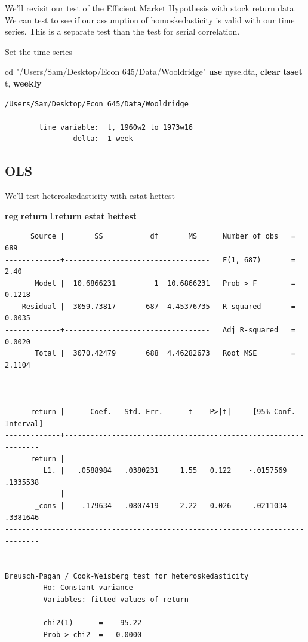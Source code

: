 \documentclass[
]{book}
\newenvironment{Shaded}{\begin{snugshade}}{\end{snugshade}}
\newcommand{\FunctionTok}[1]{\textcolor[rgb]{0.13,0.29,0.53}{\textbf{#1}}}
\newcommand{\KeywordTok}[1]{\textcolor[rgb]{0.13,0.29,0.53}{\textbf{#1}}}
\newcommand{\NormalTok}[1]{#1}
\newcommand{\OtherTok}[1]{\textcolor[rgb]{0.56,0.35,0.01}{#1}}
\newcommand{\StringTok}[1]{\textcolor[rgb]{0.31,0.60,0.02}{#1}}
\begin{document}
We'll revisit our test of the Efficient Market Hypothesis with stock return data.
We can test to see if our assumption of homoskedasticity is valid with our
time series. This is a separate test than the test for serial correlation.

Set the time series

\begin{Shaded}
\begin{Highlighting}[]
\NormalTok{cd }\StringTok{"/Users/Sam/Desktop/Econ 645/Data/Wooldridge"}
\KeywordTok{use}\NormalTok{ nyse.dta, }\KeywordTok{clear}
\KeywordTok{tsset}\NormalTok{ t, }\FunctionTok{weekly}
\end{Highlighting}
\end{Shaded}

\begin{verbatim}
/Users/Sam/Desktop/Econ 645/Data/Wooldridge

        time variable:  t, 1960w2 to 1973w16
                delta:  1 week
\end{verbatim}

\subsection*{OLS}\label{ols-3}

We'll test heteroskedasticity with estat hettest

\begin{Shaded}
\begin{Highlighting}[]
\KeywordTok{reg} \FunctionTok{return} \OtherTok{l}\NormalTok{.}\FunctionTok{return}
\KeywordTok{estat} \KeywordTok{hettest}
\end{Highlighting}
\end{Shaded}

\begin{verbatim}
      Source |       SS           df       MS      Number of obs   =       689
-------------+----------------------------------   F(1, 687)       =      2.40
       Model |  10.6866231         1  10.6866231   Prob > F        =    0.1218
    Residual |  3059.73817       687  4.45376735   R-squared       =    0.0035
-------------+----------------------------------   Adj R-squared   =    0.0020
       Total |  3070.42479       688  4.46282673   Root MSE        =    2.1104

------------------------------------------------------------------------------
      return |      Coef.   Std. Err.      t    P>|t|     [95% Conf. Interval]
-------------+----------------------------------------------------------------
      return |
         L1. |   .0588984   .0380231     1.55   0.122    -.0157569    .1335538
             |
       _cons |    .179634   .0807419     2.22   0.026     .0211034    .3381646
------------------------------------------------------------------------------


Breusch-Pagan / Cook-Weisberg test for heteroskedasticity 
         Ho: Constant variance
         Variables: fitted values of return

         chi2(1)      =    95.22
         Prob > chi2  =   0.0000
\end{verbatim}
\end{document}
